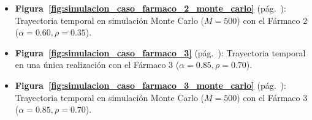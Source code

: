 \documentclass[graybox]{SNmult}
\begin{document}
\begin{itemize}
	\item \textbf{Figura~\ref{fig:simulacion_caso_farmaco_2_monte_carlo}} (pág.~\pageref{fig:simulacion_caso_farmaco_2_monte_carlo}): Trayectoria temporal en simulación Monte Carlo ($M=500$) con el Fármaco 2 ($\alpha=0.60, \rho=0.35$).
	\item \textbf{Figura~\ref{fig:simulacion_caso_farmaco_3}} (pág.~\pageref{fig:simulacion_caso_farmaco_3}): Trayectoria temporal en una única realización con el Fármaco 3 ($\alpha=0.85, \rho=0.70$).
	\item \textbf{Figura~\ref{fig:simulacion_caso_farmaco_3_monte_carlo}} (pág.~\pageref{fig:simulacion_caso_farmaco_3_monte_carlo}): Trayectoria temporal en simulación Monte Carlo ($M=500$) con el Fármaco 3 ($\alpha=0.85, \rho=0.70$).
\end{itemize}
	
\end{document}
